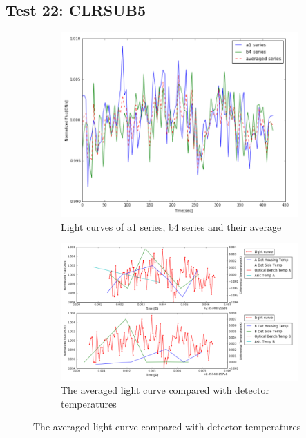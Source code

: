 \documentclass[conference]{IEEEtran}
\begin{document}
\subsection{Test 22: CLRSUB5} 
\begin{figure}[H]
    \centering
    \begin{subfigure}{1}
        \includegraphics[scale=0.4]{ts_test22}
        \caption{Light curves of a1 series, b4 series and their average}
    \end{subfigure}

    \begin{subfigure}{2}
        \includegraphics[scale=0.4]{temp_test22}
        \caption{The averaged light curve compared with detector temperatures}
    \end{subfigure}
   

\end{figure}
\end{document}
